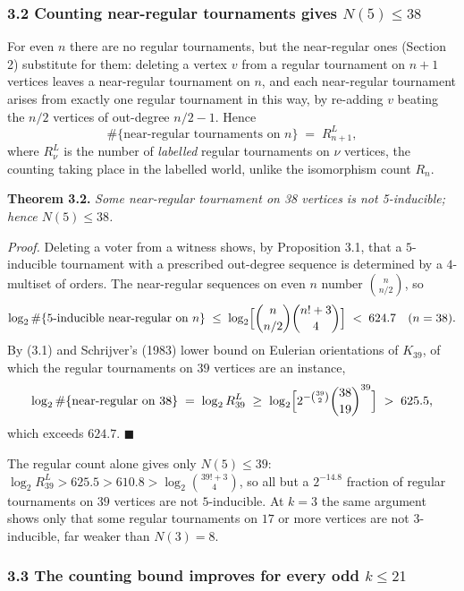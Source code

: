 \documentclass[
]{article}
\begin{document}
\subsubsection{\texorpdfstring{3.2 Counting near-regular tournaments
gives
\(N(5) \le 38\)}{3.2 Counting near-regular tournaments gives N(5) \textbackslash le 38}}\label{counting-near-regular-tournaments-gives-n5-le-38}

For even \(n\) there are no regular tournaments, but the near-regular
ones (Section 2) substitute for them: deleting a vertex \(v\) from a
regular tournament on \(n + 1\) vertices leaves a near-regular
tournament on \(n\), and each near-regular tournament arises from
exactly one regular tournament in this way, by re-adding \(v\) beating
the \(n/2\) vertices of out-degree \(n/2 - 1\). Hence
\[\#\{\text{near-regular tournaments on } n\} \;=\; R^{L}_{n+1}, \tag{3.1}\]
where \(R^{L}_{\nu}\) is the number of \emph{labelled} regular
tournaments on \(\nu\) vertices, the counting taking place in the
labelled world, unlike the isomorphism count \(R_n\).

\textbf{Theorem 3.2.} \emph{Some near-regular tournament on 38 vertices
is not 5-inducible; hence \(N(5) \le 38\).}

\emph{Proof.} Deleting a voter from a witness shows, by Proposition 3.1,
that a \(5\)-inducible tournament with a prescribed out-degree sequence
is determined by a \(4\)-multiset of orders. The near-regular sequences
on even \(n\) number \(\binom{n}{n/2}\), so
\[\log_2 \#\{\text{5-inducible near-regular on } n\} \;\le\;
\log_2\Bigl[\binom{n}{n/2}\binom{n! + 3}{4}\Bigr] \;<\; 624.7 \quad (n = 38).\]
By (3.1) and Schrijver's (1983) lower bound on Eulerian orientations of
\(K_{39}\), of which the regular tournaments on \(39\) vertices are an
instance,
\[\log_2 \#\{\text{near-regular on } 38\} \;=\; \log_2 R^{L}_{39} \;\ge\;
\log_2\Bigl[2^{-\binom{39}{2}} \binom{38}{19}^{39}\Bigr] \;>\; 625.5 ,\]
which exceeds \(624.7\). \(\blacksquare\)

The regular count alone gives only \(N(5) \le 39\):
\(\log_2 R^{L}_{39} > 625.5 > 610.8 >
\log_2 \binom{39! + 3}{4}\), so all but a \(2^{-14.8}\) fraction of
regular tournaments on \(39\) vertices are not \(5\)-inducible. At
\(k = 3\) the same argument shows only that some regular tournaments on
\(17\) or more vertices are not \(3\)-inducible, far weaker than
\(N(3) = 8\).

\subsubsection{\texorpdfstring{3.3 The counting bound improves for every
odd
\(k \le 21\)}{3.3 The counting bound improves for every odd k \textbackslash le 21}}\label{the-counting-bound-improves-for-every-odd-k-le-21}
\end{document}
